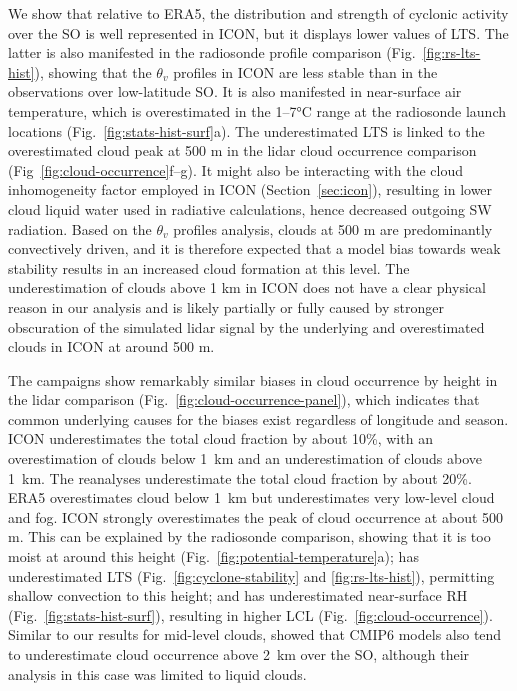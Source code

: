 \documentclass[draft]{agujournal2019}
\begin{document}
We show that relative to ERA5, the distribution and strength of cyclonic activity over the SO is well represented in ICON, but it displays lower values of LTS. The latter is also manifested in the radiosonde profile comparison (Fig.~\ref{fig:rs-lts-hist}), showing that the $\theta_v$ profiles in ICON are less stable than in the observations over low-latitude SO. It is also manifested in near-surface air temperature, which is overestimated in the 1--7°C range at the radiosonde launch locations (Fig.~\ref{fig:stats-hist-surf}a). The underestimated LTS is linked to the overestimated cloud peak at 500 m in the lidar cloud occurrence comparison (Fig~\ref{fig:cloud-occurrence}f--g). It might also be interacting with the cloud inhomogeneity factor employed in ICON (Section~\ref{sec:icon}), resulting in lower cloud liquid water used in radiative calculations, hence decreased outgoing SW radiation. Based on the $\theta_v$ profiles analysis, clouds at 500 m are predominantly convectively driven, and it is therefore expected that a model bias towards weak stability results in an increased cloud formation at this level. The underestimation of clouds above 1 km in ICON does not have a clear physical reason in our analysis and is likely partially or fully caused by stronger obscuration of the simulated lidar signal by the underlying and overestimated clouds in ICON at around 500 m.

The campaigns show remarkably similar biases in cloud occurrence by height in the lidar comparison (Fig.~\ref{fig:cloud-occurrence-panel}), which indicates that common underlying causes for the biases exist regardless of longitude and season. ICON underestimates the total cloud fraction by about 10\%, with an overestimation of clouds below 1~km and an underestimation of clouds above 1~km. The reanalyses underestimate the total cloud fraction by about 20\%. ERA5 overestimates cloud below 1~km but underestimates very low-level cloud and fog. ICON strongly overestimates the peak of cloud occurrence at about 500 m. This can be explained by the radiosonde comparison, showing that it is too moist at around this height (Fig.~\ref{fig:potential-temperature}a); has underestimated LTS (Fig.~\ref{fig:cyclone-stability} and \ref{fig:rs-lts-hist}), permitting shallow convection to this height; and has underestimated near-surface RH (Fig.~\ref{fig:stats-hist-surf}), resulting in higher LCL (Fig.~\ref{fig:cloud-occurrence}). Similar to our results for mid-level clouds,  showed that CMIP6 models also tend to underestimate cloud occurrence above 2~km over the SO, although their analysis in this case was limited to liquid clouds.
\end{document}
